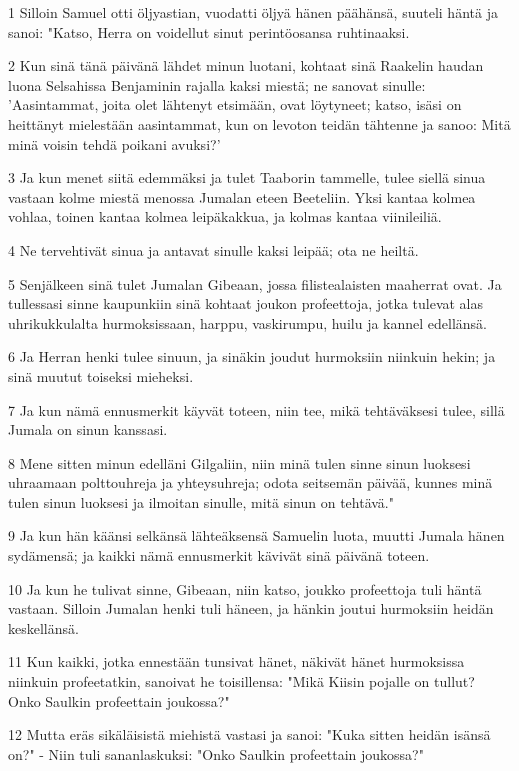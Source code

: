 \par 1 Silloin Samuel otti öljyastian, vuodatti öljyä hänen päähänsä, suuteli häntä ja sanoi: "Katso, Herra on voidellut sinut perintöosansa ruhtinaaksi.
\par 2 Kun sinä tänä päivänä lähdet minun luotani, kohtaat sinä Raakelin haudan luona Selsahissa Benjaminin rajalla kaksi miestä; ne sanovat sinulle: 'Aasintammat, joita olet lähtenyt etsimään, ovat löytyneet; katso, isäsi on heittänyt mielestään aasintammat, kun on levoton teidän tähtenne ja sanoo: Mitä minä voisin tehdä poikani avuksi?'
\par 3 Ja kun menet siitä edemmäksi ja tulet Taaborin tammelle, tulee siellä sinua vastaan kolme miestä menossa Jumalan eteen Beeteliin. Yksi kantaa kolmea vohlaa, toinen kantaa kolmea leipäkakkua, ja kolmas kantaa viinileiliä.
\par 4 Ne tervehtivät sinua ja antavat sinulle kaksi leipää; ota ne heiltä.
\par 5 Senjälkeen sinä tulet Jumalan Gibeaan, jossa filistealaisten maaherrat ovat. Ja tullessasi sinne kaupunkiin sinä kohtaat joukon profeettoja, jotka tulevat alas uhrikukkulalta hurmoksissaan, harppu, vaskirumpu, huilu ja kannel edellänsä.
\par 6 Ja Herran henki tulee sinuun, ja sinäkin joudut hurmoksiin niinkuin hekin; ja sinä muutut toiseksi mieheksi.
\par 7 Ja kun nämä ennusmerkit käyvät toteen, niin tee, mikä tehtäväksesi tulee, sillä Jumala on sinun kanssasi.
\par 8 Mene sitten minun edelläni Gilgaliin, niin minä tulen sinne sinun luoksesi uhraamaan polttouhreja ja yhteysuhreja; odota seitsemän päivää, kunnes minä tulen sinun luoksesi ja ilmoitan sinulle, mitä sinun on tehtävä."
\par 9 Ja kun hän käänsi selkänsä lähteäksensä Samuelin luota, muutti Jumala hänen sydämensä; ja kaikki nämä ennusmerkit kävivät sinä päivänä toteen.
\par 10 Ja kun he tulivat sinne, Gibeaan, niin katso, joukko profeettoja tuli häntä vastaan. Silloin Jumalan henki tuli häneen, ja hänkin joutui hurmoksiin heidän keskellänsä.
\par 11 Kun kaikki, jotka ennestään tunsivat hänet, näkivät hänet hurmoksissa niinkuin profeetatkin, sanoivat he toisillensa: "Mikä Kiisin pojalle on tullut? Onko Saulkin profeettain joukossa?"
\par 12 Mutta eräs sikäläisistä miehistä vastasi ja sanoi: "Kuka sitten heidän isänsä on?" - Niin tuli sananlaskuksi: "Onko Saulkin profeettain joukossa?"
